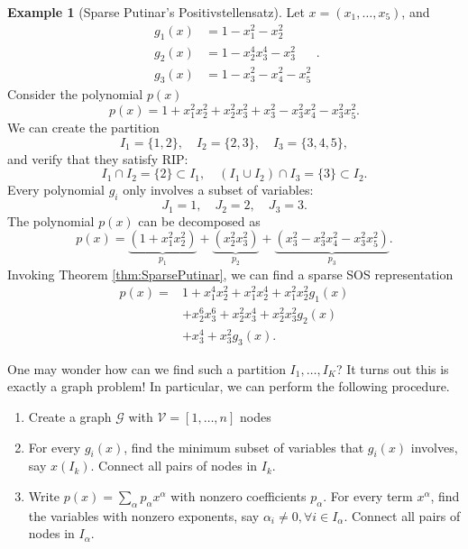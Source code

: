 \documentclass[
]{book}
\theoremstyle{definition}
\theoremstyle{definition}
\newtheorem{example}{Example}[chapter]
\theoremstyle{definition}
\theoremstyle{definition}
\theoremstyle{remark}
\begin{document}
\begin{example}[Sparse Putinar's Positivstellensatz]
\protect\hypertarget{exm:SparsePutinar}{}\label{exm:SparsePutinar}Let \(x = (x_1,\dots,x_5)\), and
\begin{equation}
\begin{split}
g_1(x) &= 1 - x_1^2 - x_2^2 \\
g_2(x) &= 1 - x_2^4 x_3^4 - x_3^2 \\
g_3(x) &= 1 - x_3^2 - x_4^2 - x_5^2
\end{split}.
\end{equation}
Consider the polynomial \(p(x)\)
\[
p(x) = 1 + x_1^2 x_2^2 + x_2^2 x_3^2 + x_3^2 - x_3^2 x_4^2 - x_3^2 x_5^2.
\]
We can create the partition
\[
I_1 = \{ 1,2 \}, \quad I_2 = \{ 2,3 \}, \quad I_3 = \{ 3,4,5 \},
\]
and verify that they satisfy RIP:
\[
I_1 \cap I_2 = \{ 2 \} \subset I_1, \quad (I_1 \cup I_2) \cap I_3 =\{ 3 \} \subset I_2.
\]
Every polynomial \(g_i\) only involves a subset of variables:
\[
J_1 = {1}, \quad J_2 = {2}, \quad J_3 = {3}.
\]
The polynomial \(p(x)\) can be decomposed as
\[
p(x) = \underbrace{(1 + x_1^2 x_2^2)}_{p_1} + \underbrace{(x_2^2 x_3^2)}_{p_2} + \underbrace{(x_3^2 - x_3^2 x_4^2 - x_3^2 x_5^2)}_{p_3}.
\]
Invoking Theorem \ref{thm:SparsePutinar}, we can find a sparse SOS representation
\begin{equation}
\begin{split}
p(x) = & 1 + x_1^4 x_2^2 + x_1^2 x_2^4 + x_1^2 x_2^2 g_1(x) \\
& + x_2^6 x_3^6 + x_2^2 x_3^4 + x_2^2 x_3^2 g_2(x) \\
& + x_3^4 + x_3^2 g_3(x).
\end{split}
\end{equation}
\end{example}

One may wonder how can we find such a partition \(I_1,\dots,I_K\)? It turns out this is exactly a graph problem! In particular, we can perform the following procedure.

\begin{enumerate}
\def\labelenumi{\arabic{enumi}.}
\item
  Create a graph \(\mathcal{G}\) with \(\mathcal{V}= [1,\dots,n]\) nodes
\item
  For every \(g_i(x)\), find the minimum subset of variables that \(g_i(x)\) involves, say \(x(I_k)\). Connect all pairs of nodes in \(I_k\).
\item
  Write \(p(x) = \sum_{\alpha} p_{\alpha} x^{\alpha}\) with nonzero coefficients \(p_{\alpha}\). For every term \(x^{\alpha}\), find the variables with nonzero exponents, say \(\alpha_i \neq 0, \forall i \in I_{\alpha}\). Connect all pairs of nodes in \(I_{\alpha}\).
\end{enumerate}
\end{document}
